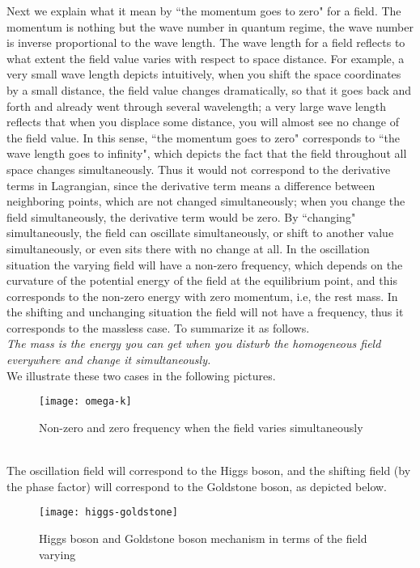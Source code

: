 \documentclass{article}
\renewcommand{\1}{\left}
\renewcommand{\2}{\right}
\begin{document}
Next we explain what it mean by ``the momentum goes to zero" for a field. The momentum is nothing but the wave number in quantum regime, the wave number is inverse proportional to the wave length. The wave length for a field reflects to what extent the field value varies with respect to space distance. For example, a very small wave length depicts intuitively, when you shift the space coordinates by a small distance, the field value changes dramatically, so that it goes back and forth and already went through several wavelength; a very large wave length reflects that when you displace some distance, you will almost see no change of the field value. In this sense,  ``the momentum goes to zero" corresponds to ``the wave length goes to infinity", which depicts the fact that the field throughout all space changes simultaneously. Thus it would not correspond to the derivative terms in Lagrangian, since the derivative term means a difference between neighboring points, which are not changed simultaneously; when you change the field simultaneously, the derivative term would be zero. By ``changing" simultaneously, the field can oscillate simultaneously, or shift to another value simultaneously, or even sits there with no change at all. In the oscillation situation the varying field will have a non-zero frequency, which depends on the curvature of the potential  energy of the field at the equilibrium point, and this corresponds to the non-zero energy with zero momentum, i.e, the rest mass. In the shifting and unchanging situation the field will not have a frequency, thus it corresponds to the massless case. To summarize it as follows.\\

\textit{The mass is the energy you can get when you disturb the homogeneous field everywhere and change it simultaneously.}\\

We illustrate these two cases in the following pictures.
\begin{figure}[h]
\centering
\texttt{[image: omega-k]}
\caption{Non-zero and zero frequency when the field varies simultaneously}
\end{figure}\\

The oscillation field will correspond to the Higgs boson, and the shifting field (by the phase factor) will correspond to the Goldstone boson, as depicted below.
\begin{figure}[h]
\centering
\texttt{[image: higgs-goldstone]}
\caption{Higgs boson and Goldstone boson mechanism in terms of the field varying}
\end{figure}\\
\end{document}
